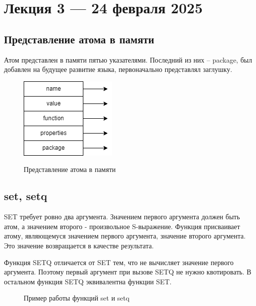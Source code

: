 \chapter{Лекция 3 — 24 февраля 2025}

\section{Представление атома в памяти}

Атом представлен в памяти пятью указателями. Последний из них -- package, был добавлен
на будущее развитие языка, первоначально представлял заглушку.

\begin{figure}[H]
    \begin{imagebox}
        \centering
        \includegraphics[height=0.2\textwidth]{img/atom.drawio.png}
        \label{fig:atom-in-memory}
    \end{imagebox}
    \caption{Представление атома в памяти}
\end{figure}

\section{set, setq}

SET требует ровно два аргумента. 
Значением первого аргумента должен быть атом, а значением 
второго - произвольное S-выражение. Функция присваивает атому, 
являющемуся значением первого аргумента, значение второго аргумента. 
Это значение возвращается в качестве результата. 

Функция SETQ отличается от SET тем, что не вычисляет значение 
первого аргумента. Поэтому первый аргумент при вызове SETQ не 
нужно квотировать. В остальном функция SETQ эквивалентна функции SET.

\begin{figure}[H]
    \begin{listingbox}{}
        
    \end{listingbox}
    \caption{Пример работы функций set и setq}
    \label{lst:set-setq-example}
\end{figure}


